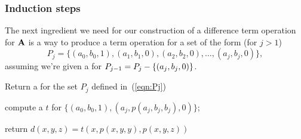   
  
  
  
  
  
  
  
  
  
  
  
  
  
  
  
  
  
  \subsubsection{Induction steps}
  \label{sec:induct}
  
  The next ingredient we need for our construction of a
  difference term operation for $\mathbf{A}$
  is
  a way to produce a \ld
  term operation for a set of the form  (for $j>1$)
  \begin{equation}
  \label{eqn:Pj}
  P_j = \{(a_0, b_0, 1), (a_1, b_1, 0), (a_2, b_2, 0), \dots,
  (a_j, b_j, 0)\},
  \end{equation}
  assuming we're given a \ldto for $P_{j-1} = P_{j} - \{(a_j, b_j, 0)\}$.
  
  
  \begin{comment}
  \noindent \underline{\bf Subroutine \ild-0}\\[4pt]
  The input, $p$,  is
  a \ldto for $P_{j-1} = P_{j} \mysetminus \{(a_j, b_j, 0)\}$.
  \begin{enumerate}[1.]
  \item
  Call Subroutine \ld-2 to
  compute a \ldto $t$ for the set
  \begin{equation*}
  \{(a_0, b_0, 1), (a_j, p(a_j, b_j, b_j), 0)\}.
  \end{equation*}
  \item Return the following
  \ldto for $P_j$:
  \begin{equation}
  d(x,y,z) = t(x, p(x,y,y), p(x,y,z)).
  \label{eq:idl0-dto}
  \end{equation}
  \end{enumerate}
  \qed
  \end{comment}
  
  
  
  
  \LinesNumbered
  \begin{algorithm}%
  
  \caption{Return a \ldto for the set $P_j$ defined in~(\ref{eqn:Pj})
  \label{alg:ild0}}
  
  compute a \ldto $t$ for $\{(a_0, b_0, 1), (a_j, p(a_j, b_j, b_j), 0)\}$;
  
  return $d(x,y,z) = t(x, p(x,y,y), p(x,y,z))$
  
  \end{algorithm}
  

